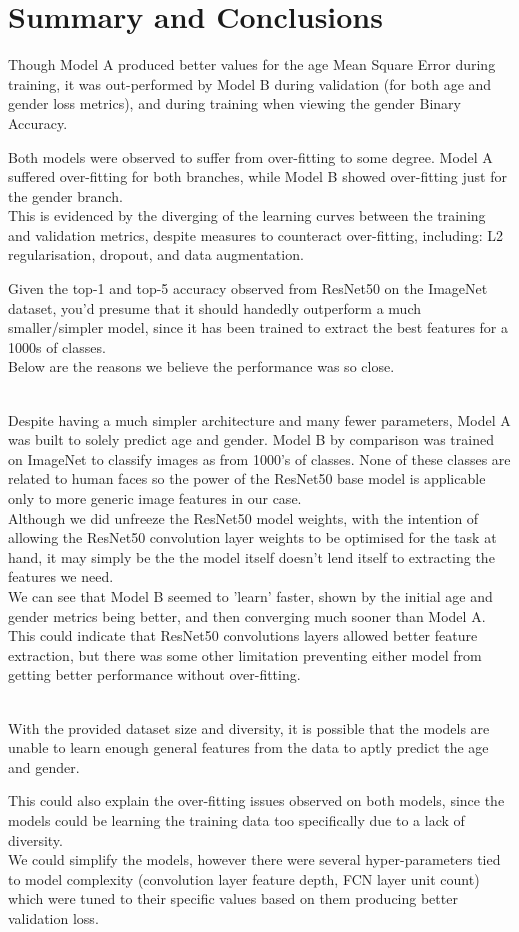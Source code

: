 \section{Summary and Conclusions}
Though Model A produced better values for the age Mean Square Error during training, it was out-performed by Model B during validation (for both age and gender loss metrics), and during training when viewing the gender Binary Accuracy.

Both models were observed to suffer from over-fitting to some degree.
Model A suffered over-fitting for both branches, while Model B showed over-fitting just for the gender branch.\\
This is evidenced by the diverging of the learning curves between the training and validation metrics, despite measures to counteract over-fitting, including: L2 regularisation, dropout, and data augmentation.

Given the top-1 and top-5 accuracy observed from ResNet50 on the ImageNet dataset, you'd presume that it should handedly outperform a much smaller/simpler model, since it has been trained to extract the best features for a 1000s of classes.\\
Below are the reasons we believe the performance was so close.

\\
Despite having a much simpler architecture and many fewer parameters, Model A was built to solely predict age and gender. Model B by comparison was trained on ImageNet to classify images as from 1000's of classes. 
None of these classes are related to human faces so the power of the ResNet50 base model is applicable only to more generic image features in our case.\\
Although we did unfreeze the ResNet50 model weights, with the intention of allowing the ResNet50 convolution layer weights to be optimised for the task at hand, it may simply be the the model itself doesn't lend itself to extracting the features we need.\\
We can see that Model B seemed to 'learn' faster, shown by the initial age and gender metrics being better, and then converging much sooner than Model A.\\
This could indicate that ResNet50 convolutions layers allowed better feature extraction, but there was some other limitation preventing either model from getting better performance without over-fitting.

\\
With the provided dataset size and diversity, it is possible that the models are unable to learn enough general features from the data to aptly predict the age and gender.

This could also explain the over-fitting issues observed on both models, since the models could be learning the training data too specifically due to a lack of diversity.\\
We could simplify the models, however there were several hyper-parameters tied to model complexity (convolution layer feature depth, FCN layer unit count) which were tuned to their specific values based on them producing better validation loss.\\
